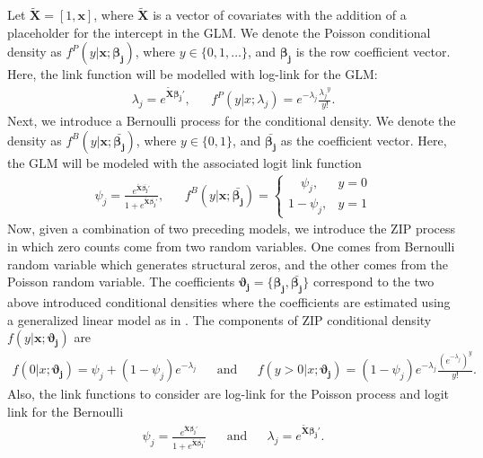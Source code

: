 \documentclass[11pt,letterpaper]{article}
\numberwithin{equation}{section}
\numberwithin{equation}{section}
\numberwithin{equation}{section}
\begin{document}
\newcommand{\xTilda}{\bm{\tilde{X}}}
Let $ \xTilda= [1,\bm{x}]$, where $\xTilda $ is a vector of covariates with the addition of a placeholder for the intercept in the GLM. We denote the Poisson conditional density  as $ f^P(y|\bm{x}; \bm{\beta_j}) $, where $y \in \{0,1,\dots\}$, and  $\bm{\beta_j}$ is the row coefficient vector. 
Here, the link function will be modelled with log-link for the GLM:
 \begin{align*}
\lambda_j = e^{\xTilda \bm{\beta_j}'}, && %
f^P(y|  x ; \lambda_{j} ) = e^{-\lambda_j} \frac{{\lambda_j}^y}{y!}.
 \end{align*}
Next, we introduce a Bernoulli process for the conditional density. We denote the density as  $ f^{B}(y|\bm{x}; \bm{\bar{\beta_j}}) $, where $y \in \{0,1 \} $, and  $\bm{\bar{\beta_j}}$ as the coefficient vector.  Here, the GLM will be modeled with the associated logit link function
 \begin{align*}
 \psi_j =  \frac{e^{\xTilda \bm{\bar{\beta_j}}'}}{1+ e^{\xTilda  \bm{\bar{\beta_j}}'}},  &&
 f^B(y | \bm{x} ; \bm{\bar{\beta_j}}) = \begin{cases} 
      \quad \psi_j, & y = 0 \\
     1 -  \psi_j,  & y = 1
   \end{cases}
 \end{align*}
 Now, given a combination of two preceding models, we introduce the ZIP process in which zero counts come from two random variables. One comes from Bernoulli random variable which generates structural zeros, and the other comes from the Poisson random variable. The coefficients $ \bm{\vartheta_{j}} =  \{ \bm{\beta_{j}},  \bm{\bar{\beta_j}} \} $ correspond to the two above introduced conditional densities where the coefficients are estimated using a generalized linear model as in \cite{Lambert}. The components of ZIP conditional density $f(y|\bm{x}; \bm{\vartheta_{j}}  )$ are %
 \begin{align*}
 f(0 | x ; \bm{ \vartheta_{j} } ) = \psi_j + (1 - \psi_j)e^{-\lambda_j}  & &  \text{and}  & &
f(y > 0 |  x ; \bm{ \vartheta_{j} } ) = (1 - \psi_j)e^{-\lambda_j} \frac{\left(e^{-\lambda_j}\right)^y  }{y!}.  
 \end{align*}
Also, the link functions to consider are log-link for the Poisson process and logit link for the Bernoulli
 \begin{align*}
 \psi_j =  \frac{e^{\xTilda \bm{\bar{\beta_j}}'}}{1+ e^{\xTilda \bm{\bar{\beta_j}}'}}  & & \text{and} & &
\lambda_j  = e^{\xTilda \bm{\beta_j}'}.
 \end{align*}
\end{document}
